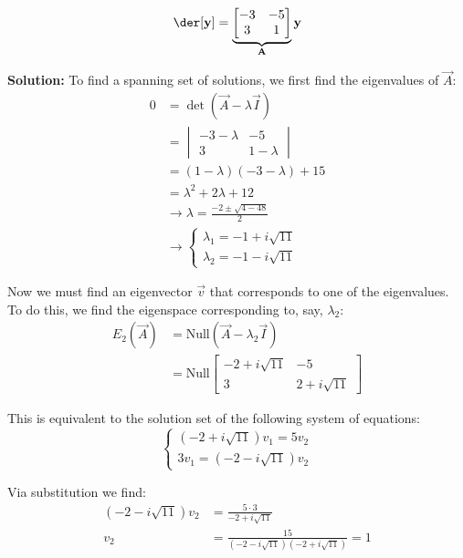 \documentclass{article}
\begin{document}
\begin{equation*}
  \der[\vec y]=\underbrace{\begin{bmatrix}
    -3&-5\\3&1
  \end{bmatrix}}_{\vec A}\vec y
\end{equation*}

\noindent\textbf{Solution:} To find a spanning set of solutions, we first find the eigenvalues of $\vec A$:
\begin{align*}
  0&=\det(\vec A-\lambda \vec I)\\
  &=\begin{vmatrix} -3-\lambda & -5 \\ 3 & 1-\lambda \end{vmatrix}\\
  &=(1-\lambda)(-3-\lambda)+15\\
  &=\lambda^2+2\lambda+12\\
  &\longrightarrow \lambda=\frac{-2\pm\sqrt{4-48}}{2}\tag{quadratic formula}\\
  &\longrightarrow \begin{cases}
    \lambda_1=-1+i\sqrt{11}\\
    \lambda_2=-1-i\sqrt{11}
  \end{cases}
\end{align*}

Now we must find an eigenvector $\vec v$ that corresponds to one of the eigenvalues. To do this, we find the eigenspace corresponding to, say, $\lambda_2$:
\begin{align*}
  E_2(\vec A)&=\text{Null}(\vec A-\lambda_2\vec I)\\
&=\text{Null}\begin{bmatrix} -2+i\sqrt{11} & -5 \\ 3 & 2+i\sqrt{11} \end{bmatrix}
\end{align*}

This is equivalent to the solution set of the following system of equations:
\begin{equation*}
  \begin{cases}
    (-2+i\sqrt{11})v_1=5v_2\\
    3v_1=(-2-i\sqrt{11})v_2
  \end{cases}
\end{equation*}

Via substitution we find:
\begin{align*}
  (-2-i\sqrt{11})v_2&=\frac{5\cdot3}{-2+i\sqrt{11}}\\
  v_2&=\frac{15}{(-2-i\sqrt{11})(-2+i\sqrt{11})}=1
\end{align*}
\end{document}
